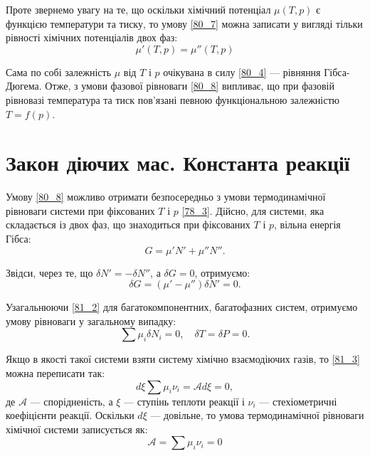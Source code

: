 Проте звернемо увагу на те, що оскільки хімічний потенціал $\mu(T, p)$ є функцією температури та тиску, то умову \eqref{80_7} можна записати у вигляді тільки рівності хімічних потенціалів двох фаз:
\begin{equation} \label{80_8}
\mu'(T,p) = \mu''(T, p)
\end{equation}

Сама по собі залежність $\mu$ від $T$ і $p$ очікувана в силу \eqref{80_4} --- рівняння Гібса-Дюгема. Отже, з умови фазової рівноваги \eqref{80_8} випливає, що при фазовій рівновазі температура та тиск пов'язані певною функціональною залежністю $T = f(p)$.

\section{Закон діючих мас. Константа реакції}

Умову \eqref{80_8} можливо отримати безпосередньо з умови термодинамічної рівноваги системи при фіксованих $T$ і $p$ \eqref{78_3}. Дійсно, для системи, яка складається із двох фаз, що знаходиться при фіксованих $T$ і $p$, вільна енергія Гібса:
\begin{equation} \label{81_1}
G = \mu' N' + \mu'' N''.
\end{equation}

Звідси, через те, що $\delta N' = -\delta N''$, а $\delta G = 0$, отримуємо:
\begin{equation} \label{81_2}
\delta G = (\mu' - \mu'') \delta N' = 0.
\end{equation}

Узагальнюючи \eqref{81_2} для багатокомпонентних, багатофазних систем, отримуємо умову рівноваги у загальному випадку:
\begin{equation} \label{81_3}
\sum \mu_i \delta N_i = 0, \quad \delta T = \delta P = 0.
\end{equation}

Якщо в якості такої системи взяти систему хімічно взаємодіючих газів, то \eqref{81_3} можна переписати так:
\begin{equation} \label{81_4}
d\xi \sum \mu_i \nu_i = \mathcal{A} d\xi = 0,
\end{equation}
де $\mathcal{A}$ --- спорідненість, а $\xi$ --- ступінь теплоти реакції і $\nu_i$ --- стехіометричні коефіцієнти реакції. Оскільки $d\xi$ --- довільне, то умова термодинамічної рівноваги хімічної системи записується як:
\begin{equation} \label{81_5}
\mathcal{A} = \sum \mu_i \nu_i = 0
\end{equation}

